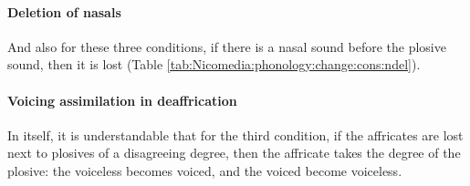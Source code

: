 \paragraph{Deletion of nasals}

And also for these three conditions, if there is a nasal sound before the plosive sound, then it is lost (Table \ref{tab:Nicomedia:phonology:change:cons:ndel}). 

\begin{table}[H]
	\centering 
	\caption{Deletion of nasals in cluster reduction in the Nicomedia dialect}
	\label{tab:Nicomedia:phonology:change:cons:ndel}
\end{table}


\paragraph{Voicing assimilation in deaffrication}


In itself, it is understandable that for the third condition, if the affricates are lost next to plosives of a disagreeing degree, then the affricate takes the degree of the plosive: the voiceless becomes voiced, and the voiced become voiceless. 

